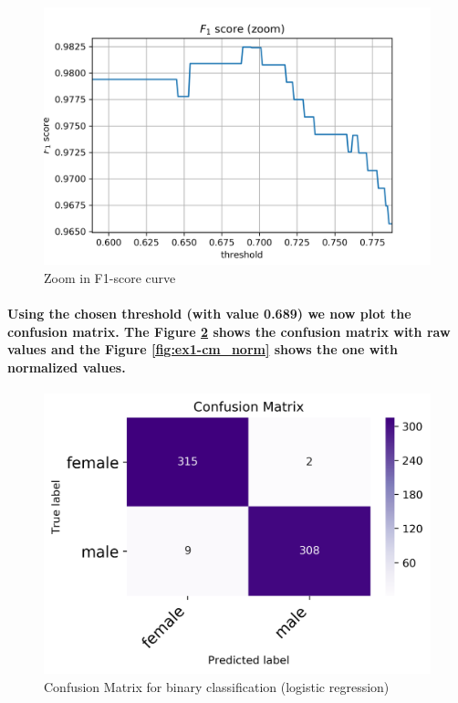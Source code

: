 \documentclass[a4paper]{article}    %
\begin{document}
\begin{figure}[H]
    \centering
    \includegraphics[width=12cm]{F1_score_zoom}
    \caption{Zoom in F1-score curve}
    \label{fig:ex1-f1_score_zoom}
\end{figure}
\newpage

\paragraph{Using the chosen threshold (with value 0.689) we now plot the confusion matrix. The Figure \ref{fig:ex1-cm_raw} shows the confusion matrix with raw values and the Figure \ref{fig:ex1-cm_norm} shows the one with normalized values.}

\begin{figure}[H]
    \centering
    \includegraphics[width=12cm]{binary_cm_raw}
    \caption{Confusion Matrix for binary classification (logistic regression)}
    \label{fig:ex1-cm_raw}
\end{figure}
\end{document}
